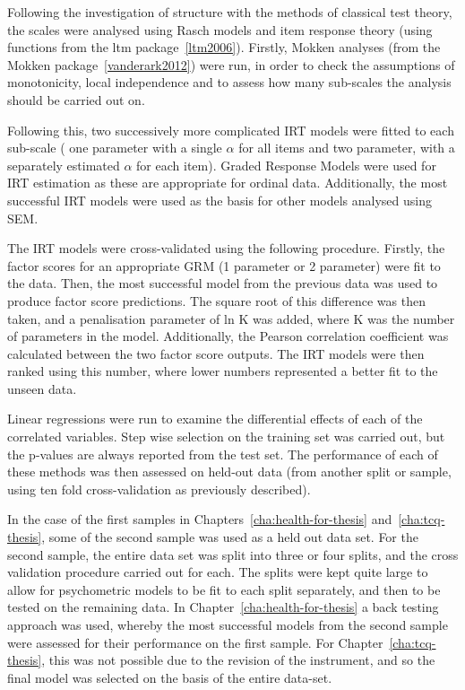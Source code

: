 Following the investigation of structure with the methods of classical test theory, the scales were analysed using Rasch models and item response theory (using functions from the ltm package~\ref{ltm2006}). Firstly, Mokken analyses (from the Mokken package~\ref{vanderark2012}) were run, in order to check the assumptions of monotonicity, local independence and to assess how many sub-scales the analysis should be carried out on. 

Following this, two successively more complicated IRT models were fitted to each sub-scale ( one parameter with a single $\alpha$ for all items and two parameter, with a separately estimated $\alpha$ for each item). Graded Response Models were used for IRT estimation as these are appropriate for ordinal data. Additionally, the most successful IRT models were used as the basis for other models analysed using SEM. 

The IRT models were cross-validated using the following procedure. Firstly, the factor scores for an appropriate GRM (1 parameter or 2 parameter) were fit to the data. Then, the most successful model from the previous data was used to produce factor score predictions. The square root of this difference was then taken, and a penalisation parameter of ln K was added, where K was the number of parameters in the model. Additionally, the Pearson correlation coefficient was calculated between the two factor score outputs. The IRT models were then ranked using this number, where lower numbers represented a better fit to the unseen data. 


Linear regressions were run to examine the differential effects of each of the correlated variables. Step wise selection on the training set was carried out, but the p-values are always reported from the test set. The performance of each of these methods was then assessed on held-out data (from another split or sample, using ten fold cross-validation as previously described). 

In the case of the first samples in Chapters~\ref{cha:health-for-thesis} and~\ref{cha:tcq-thesis}, some of the second sample was used as a held out data set. For the second sample, the entire data set was split into three or four splits, and the cross validation procedure carried out for each. The splits were kept quite large  to allow for psychometric models to be fit to each split separately, and then to be tested on the remaining data. In Chapter~\ref{cha:health-for-thesis} a back testing approach was used, whereby the most successful models from the second sample were assessed for their performance on the first sample. For Chapter~\ref{cha:tcq-thesis}, this was not possible due to the revision of the instrument, and so the final model was selected on the basis of the entire data-set. 



